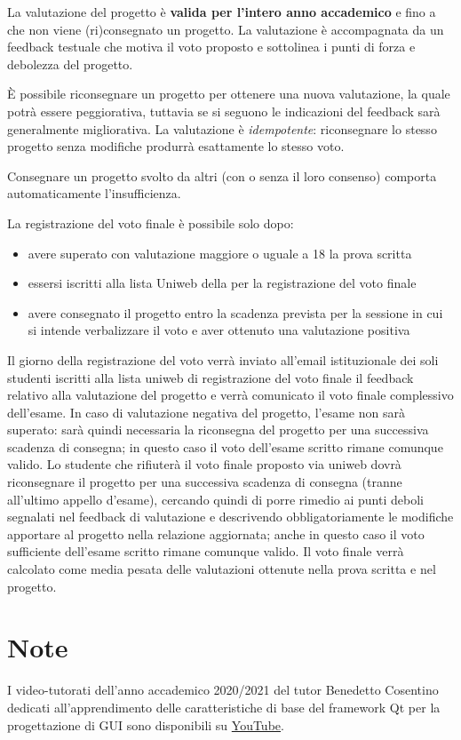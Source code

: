 \documentclass[10pt,a4paper,oneside]{article}
\begin{document}
La valutazione del progetto è \textbf{valida per l'intero anno accademico} e fino a che non viene (ri)consegnato un progetto. La valutazione è accompagnata da un feedback testuale che motiva il voto proposto e sottolinea i punti di forza e debolezza del progetto.

È possibile riconsegnare un progetto per ottenere una nuova valutazione, la quale potrà essere peggiorativa, tuttavia se si seguono le indicazioni del feedback sarà generalmente migliorativa. La valutazione è \emph{idempotente}: riconsegnare lo stesso progetto senza modifiche produrrà esattamente lo stesso voto.

Consegnare un progetto svolto da altri (con o senza il loro consenso) comporta automaticamente l'insufficienza.

La registrazione del voto finale è possibile solo dopo:
\begin{itemize}
 \item avere superato con valutazione maggiore o uguale a 18 la prova scritta
 \item essersi iscritti alla lista Uniweb della per la registrazione del voto finale
 \item avere consegnato il progetto entro la scadenza prevista per la sessione in cui si intende verbalizzare il voto e aver ottenuto una valutazione positiva
\end{itemize}
Il giorno della registrazione del voto verrà inviato all'email istituzionale dei soli studenti iscritti alla lista uniweb di registrazione del voto finale il feedback relativo alla valutazione del progetto e verrà comunicato il voto finale complessivo dell'esame. In caso di valutazione negativa del progetto, l'esame non sarà superato: sarà quindi necessaria la riconsegna del progetto per una successiva scadenza di consegna; in questo caso il voto dell'esame scritto rimane comunque valido. Lo studente che rifiuterà il voto finale proposto via uniweb dovrà riconsegnare il progetto per una successiva scadenza di consegna (tranne all'ultimo appello d'esame), cercando quindi di porre rimedio ai punti deboli segnalati nel feedback di valutazione e descrivendo obbligatoriamente le modifiche apportare al progetto nella relazione aggiornata; anche in questo caso il voto sufficiente dell'esame scritto rimane comunque valido. Il voto finale verrà calcolato come media pesata delle valutazioni ottenute nella prova scritta e nel progetto.

\section{Note}
I video-tutorati dell'anno accademico 2020/2021 del tutor Benedetto Cosentino dedicati all'apprendimento delle caratteristiche di base del framework Qt per la progettazione di GUI sono disponibili su \href{https://www.youtube.com/playlist?list=PLH_Fd-836q-VcqWnnzsq3GOF2-0i_Az7p}{YouTube}.
\end{document}
